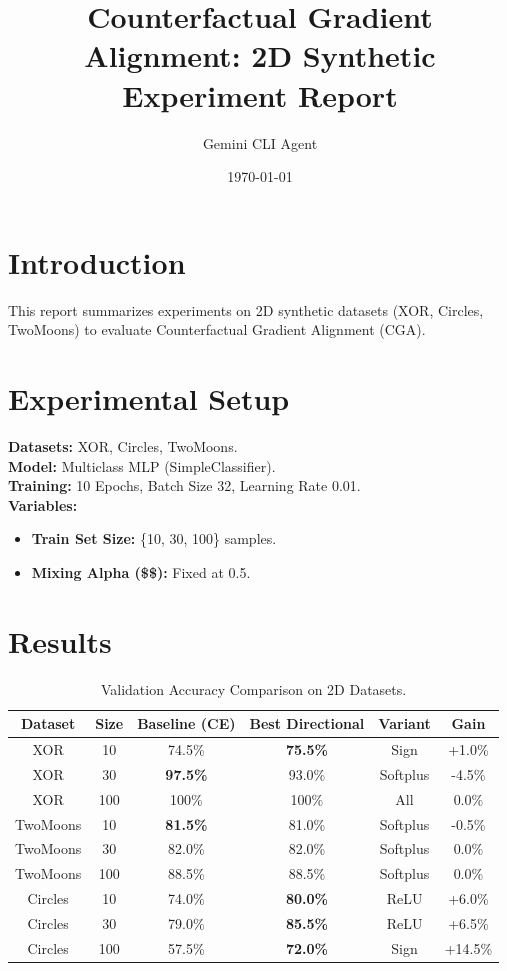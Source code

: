 \documentclass{article}
\title{Counterfactual Gradient Alignment: 2D Synthetic Experiment Report}
\author{Gemini CLI Agent}
\date{\today}
\begin{document}
\maketitle

\section{Introduction}
This report summarizes experiments on 2D synthetic datasets (XOR, Circles, TwoMoons) to evaluate Counterfactual Gradient Alignment (CGA).

\section{Experimental Setup}
\textbf{Datasets:} XOR, Circles, TwoMoons. \\
\textbf{Model:} Multiclass MLP (SimpleClassifier). \\
\textbf{Training:} 10 Epochs, Batch Size 32, Learning Rate 0.01. \\
\textbf{Variables:}
\begin{itemize}
    \item \textbf{Train Set Size:} \{10, 30, 100\} samples.
    \item \textbf{Mixing Alpha (\$\alpha\$):} Fixed at 0.5.
\end{itemize}

\section{Results}

\begin{table}[h]
\centering
\begin{tabular}{@{}cccccc@{}}
\toprule
\textbf{Dataset} & \textbf{Size} & \textbf{Baseline (CE)} & \textbf{Best Directional} & \textbf{Variant} & \textbf{Gain} \\
\midrule
XOR & 10 & 74.5\% & \textbf{75.5\%} & Sign & +1.0\% \\
XOR & 30 & \textbf{97.5\%} & 93.0\% & Softplus & -4.5\% \\
XOR & 100 & 100\% & 100\% & All & 0.0\% \\
\midrule
TwoMoons & 10 & \textbf{81.5\%} & 81.0\% & Softplus & -0.5\% \\
TwoMoons & 30 & 82.0\% & 82.0\% & Softplus & 0.0\% \\
TwoMoons & 100 & 88.5\% & 88.5\% & Softplus & 0.0\% \\
\midrule
Circles & 10 & 74.0\% & \textbf{80.0\%} & ReLU & +6.0\% \\
Circles & 30 & 79.0\% & \textbf{85.5\%} & ReLU & +6.5\% \\
Circles & 100 & 57.5\% & \textbf{72.0\%} & Sign & +14.5\% \\
\bottomrule
\end{tabular}
\caption{Validation Accuracy Comparison on 2D Datasets.}
\label{tab:results}
\end{table}
\end{document}
